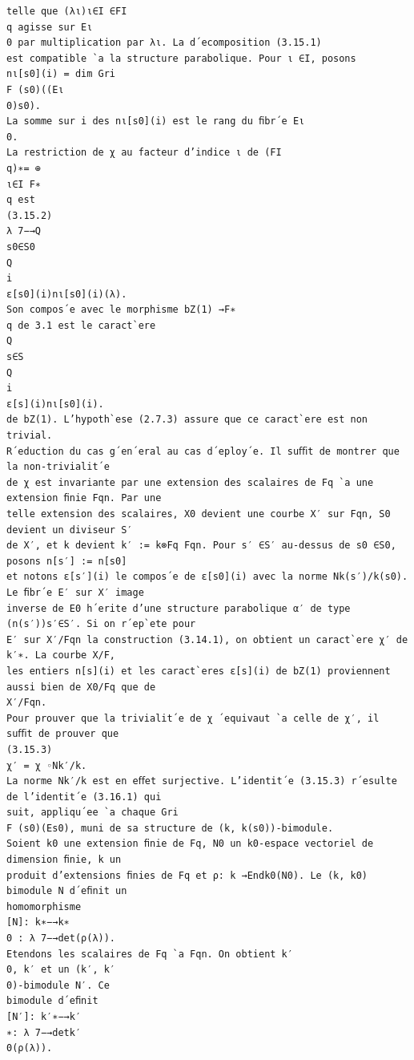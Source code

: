 \documentclass[11pt]{article}
\begin{document}
\begin{Verbatim}[breaklines=true,fontsize=\small]
telle que (λι)ι∈I ∈FI
q agisse sur Eι
0 par multiplication par λι. La d´ecomposition (3.15.1)
est compatible `a la structure parabolique. Pour ι ∈I, posons
nι[s0](i) = dim Gri
F (s0)((Eι
0)s0).
La somme sur i des nι[s0](i) est le rang du ﬁbr´e Eι
0.
La restriction de χ au facteur d’indice ι de (FI
q)∗= ⊕
ι∈I F∗
q est
(3.15.2)
λ 7−→Q
s0∈S0
Q
i
ε[s0](i)nι[s0](i)(λ).
Son compos´e avec le morphisme bZ(1) →F∗
q de 3.1 est le caract`ere
Q
s∈S
Q
i
ε[s](i)nι[s0](i).
de bZ(1). L’hypoth`ese (2.7.3) assure que ce caract`ere est non trivial.
R´eduction du cas g´en´eral au cas d´eploy´e. Il suﬃt de montrer que la non-trivialit´e
de χ est invariante par une extension des scalaires de Fq `a une extension ﬁnie Fqn. Par une
telle extension des scalaires, X0 devient une courbe X′ sur Fqn, S0 devient un diviseur S′
de X′, et k devient k′ := k⊗Fq Fqn. Pour s′ ∈S′ au-dessus de s0 ∈S0, posons n[s′] := n[s0]
et notons ε[s′](i) le compos´e de ε[s0](i) avec la norme Nk(s′)/k(s0). Le ﬁbr´e E′ sur X′ image
inverse de E0 h´erite d’une structure parabolique α′ de type (n(s′))s′∈S′. Si on r´ep`ete pour
E′ sur X′/Fqn la construction (3.14.1), on obtient un caract`ere χ′ de k′∗. La courbe X/F,
les entiers n[s](i) et les caract`eres ε[s](i) de bZ(1) proviennent aussi bien de X0/Fq que de
X′/Fqn.
Pour prouver que la trivialit´e de χ ´equivaut `a celle de χ′, il suﬃt de prouver que
(3.15.3)
χ′ = χ ◦Nk′/k.
La norme Nk′/k est en eﬀet surjective. L’identit´e (3.15.3) r´esulte de l’identit´e (3.16.1) qui
suit, appliqu´ee `a chaque Gri
F (s0)(Es0), muni de sa structure de (k, k(s0))-bimodule.
Soient k0 une extension ﬁnie de Fq, N0 un k0-espace vectoriel de dimension ﬁnie, k un
produit d’extensions ﬁnies de Fq et ρ: k →Endk0(N0). Le (k, k0) bimodule N d´eﬁnit un
homomorphisme
[N]: k∗−→k∗
0 : λ 7−→det(ρ(λ)).
Etendons les scalaires de Fq `a Fqn. On obtient k′
0, k′ et un (k′, k′
0)-bimodule N′. Ce
bimodule d´eﬁnit
[N′]: k′∗−→k′
∗: λ 7−→detk′
0(ρ(λ)).


\end{Verbatim}
\end{document}
